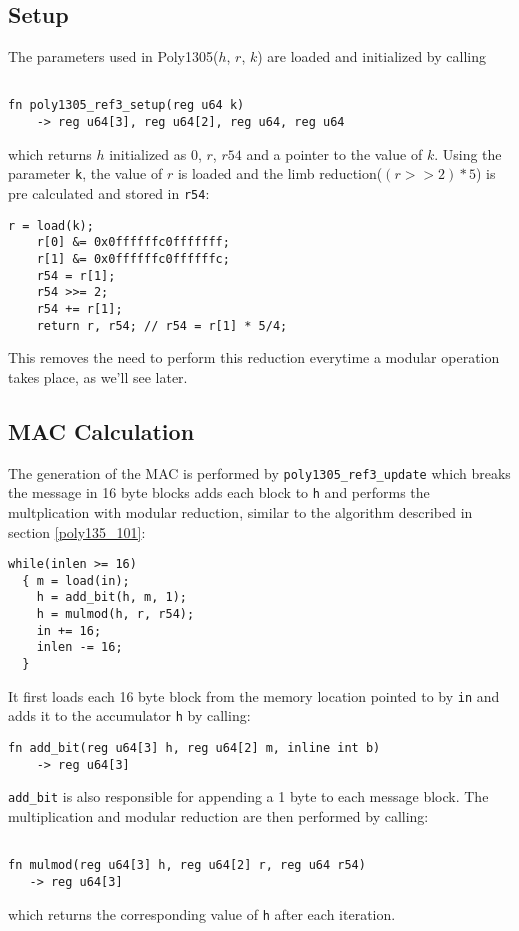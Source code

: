 \documentclass{article}
\begin{document}
\subsection{Setup}
The parameters used in Poly1305($h$, $r$, $k$) are loaded and initialized by calling 

\begin{Verbatim}[fontsize=\footnotesize]

fn poly1305_ref3_setup(reg u64 k) 
    -> reg u64[3], reg u64[2], reg u64, reg u64

\end{Verbatim}

which returns $h$ initialized as 0, $r$, $r54$ and a pointer to the value of $k$.
Using the parameter \texttt{k}, the value of $r$ is loaded and the limb reduction($(r>>2)*5$) is pre calculated and stored in \texttt{r54}:
\begin{Verbatim}[fontsize=\footnotesize]
    r = load(k);
    r[0] &= 0x0ffffffc0fffffff;
    r[1] &= 0x0ffffffc0ffffffc;
    r54 = r[1];
    r54 >>= 2;
    r54 += r[1];
    return r, r54; // r54 = r[1] * 5/4;
\end{Verbatim}
This removes the need to perform this reduction everytime a modular operation takes place, as we'll see later.

\subsection{MAC Calculation}
The generation of the MAC is performed by \texttt{poly1305\_ref3\_update} which breaks the message in 16 byte blocks adds each block to \texttt{h} and performs
the multplication with modular reduction, similar to the algorithm described in section \ref{poly135_101}:
\begin{Verbatim}[fontsize=\footnotesize]
while(inlen >= 16)
  { m = load(in);
    h = add_bit(h, m, 1);
    h = mulmod(h, r, r54);
    in += 16;
    inlen -= 16;
  }
\end{Verbatim}

It first loads each 16 byte block from the memory location pointed to by \texttt{in} and adds it to the accumulator \texttt{h} by calling: 
\begin{Verbatim}[fontsize=\footnotesize]
fn add_bit(reg u64[3] h, reg u64[2] m, inline int b) 
    -> reg u64[3]
\end{Verbatim}

\texttt{add\_bit} is also responsible for appending a 1 byte to each message block. The multiplication and modular reduction are then performed by calling:
\begin{Verbatim}[fontsize=\footnotesize]

fn mulmod(reg u64[3] h, reg u64[2] r, reg u64 r54) 
   -> reg u64[3]

\end{Verbatim}
which returns the corresponding value of \texttt{h} after each iteration.
\end{document}
